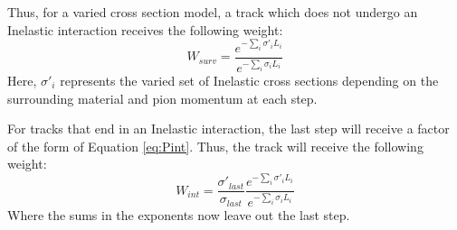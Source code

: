 \documentclass[12pt]{article}
\begin{document}
Thus, for a varied cross section model, a track which does not undergo an Inelastic interaction receives the following weight:
\begin{equation}\label{eq:surv_weight}
  W_{surv} = \frac{e^{- \sum \limits_{i} \sigma'_i L_i}}{e^{- \sum \limits_{i} \sigma_i L_i}}
\end{equation}
Here, $\sigma'_i$ represents the varied set of Inelastic cross sections depending on the surrounding material and pion momentum at each step.

For tracks that end in an Inelastic interaction, the last step will receive a factor of the form of Equation \ref{eq:Pint}. Thus, the track will receive the following weight: 
\begin{equation}\label{eq:int_weight}
  W_{int} = \frac{\sigma'_{last}}{\sigma_{last}} \frac{e^{- \sum \limits_{i} \sigma'_i L_i}}{e^{- \sum \limits_{i} \sigma_i L_i}}
\end{equation}
Where the sums in the exponents now leave out the last step.
\end{document}

